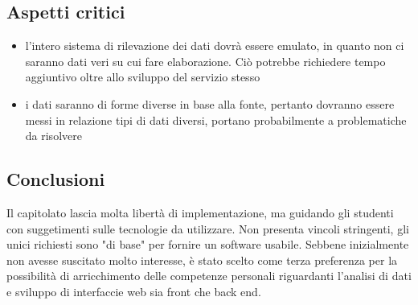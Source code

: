 \subsection{Aspetti critici}
\begin{itemize}
    \item l'intero sistema di rilevazione dei dati dovrà essere emulato, in quanto non ci saranno dati veri su cui fare elaborazione. Ciò potrebbe richiedere tempo aggiuntivo oltre allo sviluppo del servizio stesso
    \item i dati saranno di forme diverse in base alla fonte, pertanto dovranno essere messi in relazione tipi di dati diversi, portano probabilmente a problematiche da risolvere
\end{itemize}
\subsection{Conclusioni}
Il capitolato lascia molta libertà di implementazione, ma guidando gli studenti con suggetimenti sulle tecnologie da utilizzare.
Non presenta vincoli stringenti, gli unici richiesti sono "di base" per fornire un software usabile.
Sebbene inizialmente non avesse suscitato molto interesse, è stato scelto come terza preferenza per la possibilità di arricchimento delle competenze personali
riguardanti l'analisi di dati e sviluppo di interfaccie web sia front che back end.
